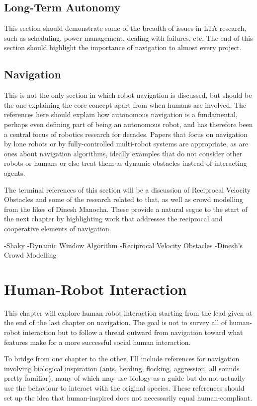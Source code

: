 \documentclass{sfuthesis}
\begin{document}
\section{Long-Term Autonomy}

This section should demonstrate some of the breadth of issues in LTA research, such as scheduling, power management, dealing with failures, etc. The end of this section should highlight the importance of navigation to almost every project.

\section{Navigation}

This is not the only section in which robot navigation is discussed, but should be the one explaining the core concept apart from when humans are involved. The references here should explain how autonomous navigation is a fundamental, perhaps even defining part of being an autonomous robot, and has therefore been a central focus of robotics research for decades. Papers that focus on navigation by lone robots or by fully-controlled multi-robot systems are appropriate, as are ones about navigation algorithms, ideally examples that do not consider other robots or humans or else treat them as dynamic obstacles instead of interacting agents.

The terminal references of this section will be a discussion of Reciprocal Velocity Obstacles and some of the research related to that, as well as crowd modelling from the likes of Dinesh Manocha. These provide a natural segue to the start of the next chapter by highlighting work that addresses the reciprocal and cooperative elements of navigation.

-Shaky
-Dynamic Window Algorithm
-Reciprocal Velocity Obstacles
-Dinesh's Crowd Modelling



\chapter{Human-Robot Interaction}

This chapter will explore human-robot interaction starting from the lead given at the end of the last chapter on navigation. The goal is not to survey all of human-robot interaction but to follow a thread outward from navigation toward what features make for a more successful social human interaction.

To bridge from one chapter to the other, I'll include references for navigation involving biological inspiration (ants, herding, flocking, aggression, all sounds pretty familiar), many of which may use biology as a guide but do not actually use the behaviour to interact with the original species. These references should set up the idea that human-inspired does not necessarily equal human-compliant.
\end{document}
